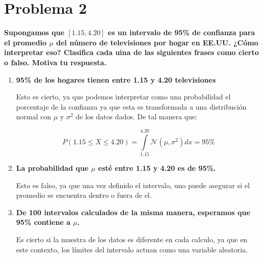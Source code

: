 \section*{Problema 2}

\textbf{Supongamos que $[1.15,4.20]$ es un intervalo de 95\% de confianza para el promedio $\mu$ del número de televisiones por hogar en EE.UU. ¿Cómo interpretar eso? Clasifica cada uina de las siguientes frases como cierto o falso. Motiva tu respuesta.}

\begin{enumerate}
    \item \textbf{95\% de los hogares tienen entre 1.15 y 4.20 televisiones}

          Esto es cierto, ya que podemos interpretar como una probabilidad el porcentaje de la confianza ya que esta es transformada a una distribución normal con $\mu$ y $\sigma^2$ de los datos dados. De tal manera que:

          \begin{equation*}
              P(1.15\leq X\leq 4.20) =  \int\limits_{1.15}^{4.20} \mathcal{N}(\mu,\sigma^2)dx  = 95\%
          \end{equation*}

    \item \textbf{La probabilidad que $\mu$ esté entre 1.15 y 4.20 es de 95\%.}

          Esto es falso, ya que una vez definido el intervalo, uno puede asegurar si el promedio se encuentra dentro o fuera de el.

    \item \textbf{De 100 intervalos calculados de la misma manera, esperamos que 95\% contiene a $\mu$.}

          Es cierto si la muestra de los datos es diferente en cada calculo, ya que en este contexto, los límites del intervalo actuan como una variable aleatoria.
\end{enumerate}